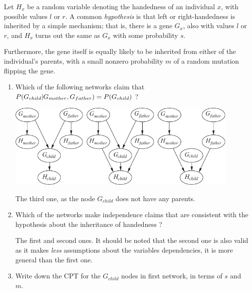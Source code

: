\documentclass[11pt, a4paper]{article}
\begin{document}
Let $H_x$ be a random variable denoting the handedness of an individual $x$, with possible values $l$ or $r$. A common \emph{hypothesis} is that left or right-handedness is inherited by a simple mechanism; that is, there is a gene $G_x$, also with values $l$ or $r$, and $H_x$ turns out the same as $G_x$ with some probability $s$. 

Furthermore, the gene itself is equally likely to be inherited from either of the individual's parents, with a small nonzero probability $m$ of a random mutation flipping the gene.

\begin{enumerate}
    \item Which of the following networks claim that $P(G_{child} \vert G_{mother}, G_{father}) = P(G_{child})$ ?
    
    \begin{center}
        \includegraphics[width=0.9\textwidth]{figures/e3_handedness.pdf}
    \end{center}
    
    \begin{solution}
        The third one, as the node $G_{child}$ does not have any parents.
    \end{solution}
    
    \item Which of the networks make independence claims that are consistent with the hypothesis about the inheritance of handedness ?
    
    \begin{solution}
        The first and second ones. It should be noted that the second one is also valid as it makes \emph{less} assumptions about the variables dependencies, \ie{} it is more general than the first one.
    \end{solution}
    
    \item Write down the CPT for the $G_{child}$ nodes in first network, in terms of $s$ and $m$.
    
    \begin{solution}
        \vspace{1ex}
    

\end{solution}
\end{enumerate}
\end{document}

